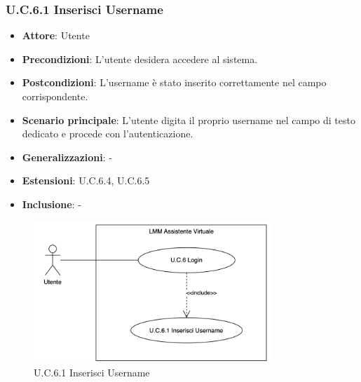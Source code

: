 \subsubsection{U.C.6.1 Inserisci Username}  %
\begin{itemize}
    \item \textbf{Attore}: Utente
    \item \textbf{Precondizioni}: L'utente desidera accedere al sistema.
    \item \textbf{Postcondizioni}: L'username è stato inserito correttamente nel campo corrispondente.
    \item \textbf{Scenario principale}: L'utente digita il proprio username nel campo di testo dedicato e procede con l'autenticazione.
    \item \textbf{Generalizzazioni}: -
    \item \textbf{Estensioni}: U.C.6.4, U.C.6.5
    \item \textbf{Inclusione}: -
\end{itemize}
\begin{figure}[H]
    \centering
    \includegraphics[width=0.8\textwidth]{img/UC6.1.png}
    \caption{U.C.6.1 Inserisci Username}
\end{figure}
\newpage

